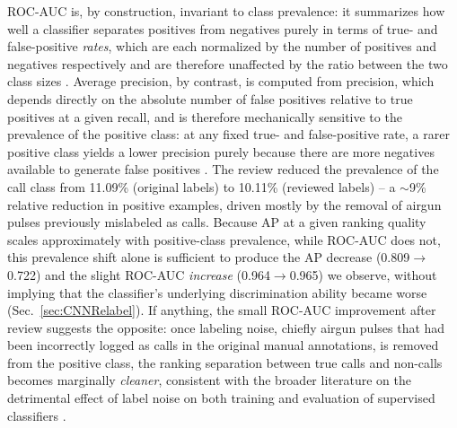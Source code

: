 \documentclass[preprint,NumberedRefs]{JASAnew}
\begin{document}
ROC-AUC is, by construction, invariant to class prevalence: it summarizes
how well a classifier separates positives from negatives purely in terms of
true- and false-positive \emph{rates}, which are each normalized by the
number of positives and negatives respectively and are therefore unaffected
by the ratio between the two class sizes \cite{fawcett2006introduction}.
Average precision, by contrast, is computed from precision, which depends
directly on the absolute number of false positives relative to true
positives at a given recall, and is therefore mechanically sensitive to the
prevalence of the positive class: at any fixed true- and false-positive
rate, a rarer positive class yields a lower precision purely because there
are more negatives available to generate false positives
\cite{davis2006relationship,saito2015precision,he2009learning}. The review
reduced the prevalence of the call class from 11.09\% (original labels) to
10.11\% (reviewed labels) -- a $\sim$9\% relative reduction in positive
examples, driven mostly by the removal of airgun pulses previously
mislabeled as calls. Because AP at a given ranking quality scales
approximately with positive-class prevalence, while ROC-AUC does not, this
prevalence shift alone is sufficient to produce the AP decrease
(0.809$\to$0.722) and the slight ROC-AUC \emph{increase}
(0.964$\to$0.965) we observe, without implying that the classifier's
underlying discrimination ability became worse (Sec.~\ref{sec:CNNRelabel}).
If anything, the small ROC-AUC improvement after review suggests the
opposite: once labeling noise, chiefly airgun pulses that had been
incorrectly logged as calls in the original manual annotations, is removed
from the positive class, the ranking separation between true calls and
non-calls becomes marginally \emph{cleaner}, consistent with the broader
literature on the detrimental effect of label noise on both training and
evaluation of supervised classifiers \cite{frenay2014classification,
northcutt2021confident}.
\end{document}
